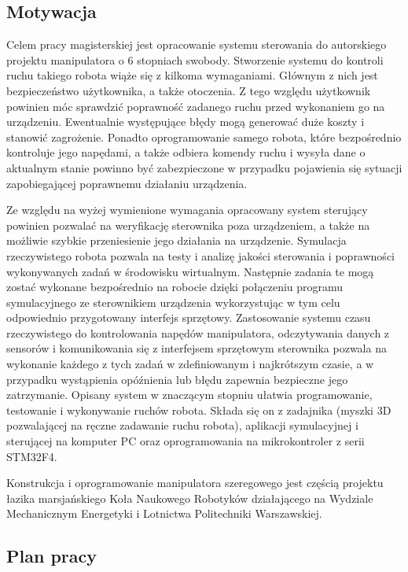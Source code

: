 \documentclass[a4paper, 12pt, twoside]{article}
\begin{document}
\subsection{Motywacja}

Celem pracy magisterskiej jest opracowanie systemu sterowania do autorskiego projektu manipulatora o 6 stopniach swobody. Stworzenie systemu do kontroli ruchu takiego robota wiąże się z kilkoma wymaganiami. Głównym z nich jest bezpieczeństwo użytkownika, a także otoczenia. Z tego względu użytkownik powinien móc sprawdzić poprawność zadanego ruchu przed wykonaniem go na urządzeniu. Ewentualnie występujące błędy mogą generować duże koszty i stanowić zagrożenie. Ponadto oprogramowanie samego robota, które bezpośrednio kontroluje jego napędami, a także odbiera komendy ruchu i wysyła dane o aktualnym stanie powinno być zabezpieczone w przypadku pojawienia się sytuacji zapobiegającej poprawnemu działaniu urządzenia. 

Ze względu na wyżej wymienione wymagania opracowany system sterujący powinien pozwalać na weryfikację sterownika poza urządzeniem, a także na możliwie szybkie przeniesienie jego działania na urządzenie. Symulacja rzeczywistego robota pozwala na testy i analizę jakości sterowania i poprawności wykonywanych zadań w środowisku wirtualnym. Następnie zadania te mogą zostać wykonane bezpośrednio na robocie dzięki połączeniu programu symulacyjnego ze sterownikiem urządzenia wykorzystując w tym celu odpowiednio przygotowany interfejs sprzętowy. Zastosowanie systemu czasu rzeczywistego do kontrolowania napędów manipulatora, odczytywania danych z sensorów i komunikowania się z interfejsem sprzętowym sterownika pozwala na wykonanie każdego z tych zadań w zdefiniowanym i najkrótszym czasie, a w przypadku wystąpienia opóźnienia lub błędu zapewnia bezpieczne jego zatrzymanie. Opisany system w znaczącym stopniu ułatwia programowanie, testowanie i wykonywanie ruchów robota. Składa się on z zadajnika (myszki 3D pozwalającej na ręczne zadawanie ruchu robota), aplikacji symulacyjnej i sterującej na komputer PC oraz oprogramowania na mikrokontroler z serii STM32F4.

Konstrukcja i oprogramowanie manipulatora szeregowego jest częścią projektu łazika marsjańskiego Koła Naukowego Robotyków działającego na Wydziale Mechanicznym Energetyki i Lotnictwa Politechniki Warszawskiej.

\subsection{Plan pracy}
\end{document}

